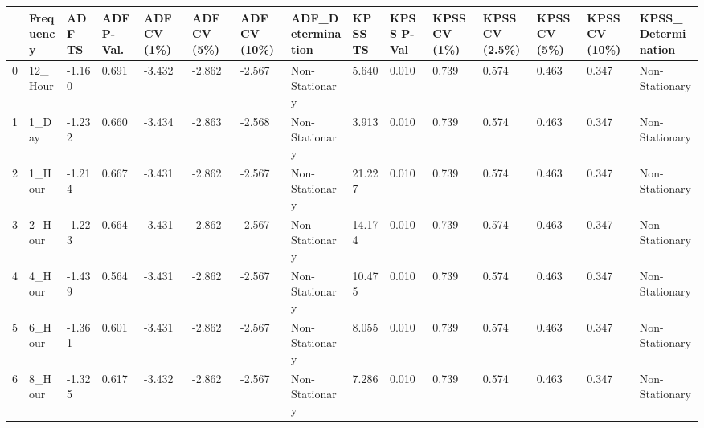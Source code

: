 \begin{tabular}{lllllllllllllll}
\toprule
 & Frequency & ADF TS & ADF P-Val. & ADF CV (1\%) & ADF CV (5\%) & ADF CV (10\%) & ADF_Determination & KPSS TS & KPSS P-Val & KPSS CV (1\%) & KPSS CV (2.5\%) & KPSS CV (5\%) & KPSS CV (10\%) & KPSS_Determination \\
\midrule
0 & 12_Hour & -1.160 & 0.691 & -3.432 & -2.862 & -2.567 & Non-Stationary & 5.640 & 0.010 & 0.739 & 0.574 & 0.463 & 0.347 & Non-Stationary \\
1 & 1_Day & -1.232 & 0.660 & -3.434 & -2.863 & -2.568 & Non-Stationary & 3.913 & 0.010 & 0.739 & 0.574 & 0.463 & 0.347 & Non-Stationary \\
2 & 1_Hour & -1.214 & 0.667 & -3.431 & -2.862 & -2.567 & Non-Stationary & 21.227 & 0.010 & 0.739 & 0.574 & 0.463 & 0.347 & Non-Stationary \\
3 & 2_Hour & -1.223 & 0.664 & -3.431 & -2.862 & -2.567 & Non-Stationary & 14.174 & 0.010 & 0.739 & 0.574 & 0.463 & 0.347 & Non-Stationary \\
4 & 4_Hour & -1.439 & 0.564 & -3.431 & -2.862 & -2.567 & Non-Stationary & 10.475 & 0.010 & 0.739 & 0.574 & 0.463 & 0.347 & Non-Stationary \\
5 & 6_Hour & -1.361 & 0.601 & -3.431 & -2.862 & -2.567 & Non-Stationary & 8.055 & 0.010 & 0.739 & 0.574 & 0.463 & 0.347 & Non-Stationary \\
6 & 8_Hour & -1.325 & 0.617 & -3.432 & -2.862 & -2.567 & Non-Stationary & 7.286 & 0.010 & 0.739 & 0.574 & 0.463 & 0.347 & Non-Stationary \\
\bottomrule
\end{tabular}
